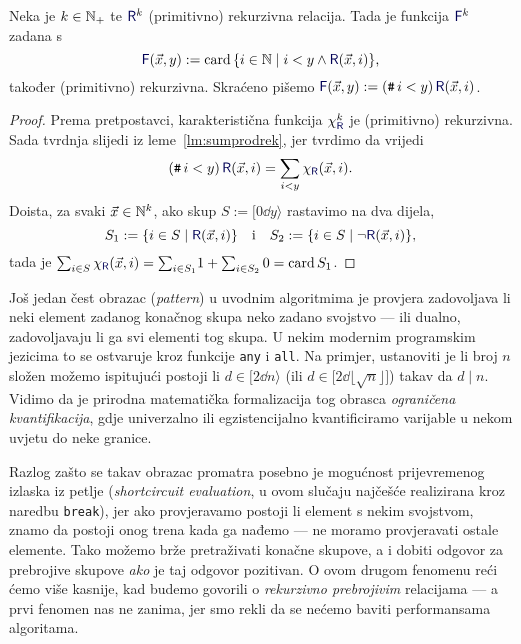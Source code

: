 \begin{lema}[{name=[ograničeno brojenje čuva (primitivnu) rekurzivnost]}]\label{lm:brojrek}
\!Neka je $k\in{\mathbb N}_+$ te $\f R^k$ (primitivno) rekurzivna relacija. Tada je funkcija $\f F^k$ zadana s
\begin{equation}
    \f F(\vec x,y):=\card\,\{i\in\N\mid i<y\land\f R(\vec x,i)\}\text,
\end{equation}
također (primitivno) rekurzivna. Skraćeno pišemo $\f F(\vec x,y):=(\num i<y)\,\f R(\vec x,i)$.
\end{lema}
\begin{proof}
    Prema pretpostavci, karakteristična funkcija $\chi_{\f R}^k$ je (primitivno) rekurzivna. Sada tvrdnja slijedi iz leme~\ref{lm:sumprodrek}, jer tvrdimo da vrijedi
	\begin{equation}\label{eq:countsum}
        (\num i<y)\,\f R(\vec x,i)=\sum_{i<y}\chi_{\f R}(\vec x,i)\text.
    \end{equation}
    Doista, za svaki $\vec x\in{\mathbb N}^k$, ako skup $S:=[0\dd y\rangle$ rastavimo na dva dijela,
    \begin{equation}
	    S_1:=\{i\in S\mid\f R(\vec x,i)\}\quad\text i\quad
        S_2:=\{i\in S\mid\lnot\f R(\vec x,i)\}\text,
    \end{equation}
    tada je
        $\sum_{i\in S}\chi_{\f R}(\vec x,i)=\sum_{i\in S_1}\!1+\sum_{i\in S_2}0=\card S_1$.
\end{proof}


Još jedan čest obrazac (\emph{pattern}) u uvodnim algoritmima je provjera zadovoljava li neki element zadanog konačnog skupa neko zadano svojstvo --- ili dualno, zadovoljavaju li ga svi elementi tog skupa. U nekim modernim programskim jezicima to se ostvaruje kroz funkcije \texttt{any} i \texttt{all}. Na primjer, ustanoviti je li broj $n$ složen možemo ispitujući postoji li $d\in[2\dd n\rangle$ (ili $d\in\bigl[2\dd \lfloor\!\sqrt{n}\rfloor\bigr]$) takav da $d\mathrel|n$. Vidimo da je prirodna matematička formalizacija tog obrasca \emph{ograničena kvantifikacija}, gdje univerzalno ili egzistencijalno kvantificiramo varijable u nekom uvjetu do neke granice.

Razlog zašto se takav obrazac promatra posebno je mogućnost prijevremenog izlaska iz petlje (\emph{shortcircuit evaluation}, u ovom slučaju najčešće realizirana kroz naredbu \texttt{break}), jer ako provjeravamo postoji li element s nekim svojstvom, znamo da postoji onog trena kada ga nađemo --- ne moramo provjeravati ostale elemente. Tako možemo brže pretraživati konačne skupove, a i dobiti odgovor za prebrojive skupove \emph{ako} je taj odgovor pozitivan. O ovom drugom fenomenu reći ćemo više kasnije, kad budemo govorili o \emph{rekurzivno prebrojivim} relacijama --- a prvi fenomen nas ne zanima, jer smo rekli da se nećemo baviti performansama algoritama.

